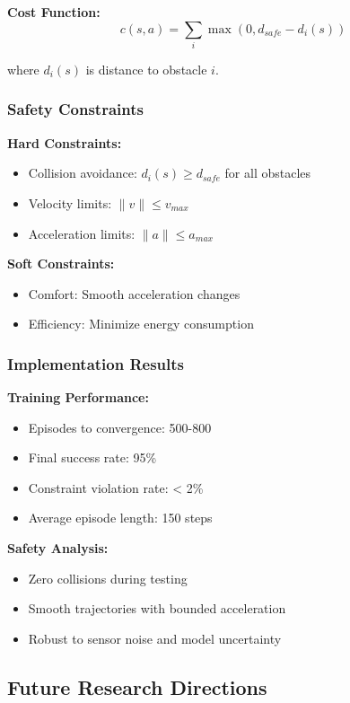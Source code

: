 \documentclass[12pt]{article}
\begin{document}
{{{{\textbf{Cost Function:}
\begin{equation}
c(s,a) = \sum_{i} \max(0, d_{safe} - d_i(s))
\end{equation}

where $d_i(s)$ is distance to obstacle $i$.

\subsubsection{Safety Constraints}

\textbf{Hard Constraints:}
\begin{itemize}
\item Collision avoidance: $d_i(s) \geq d_{safe}$ for all obstacles
\item Velocity limits: $\|v\| \leq v_{max}$
\item Acceleration limits: $\|a\| \leq a_{max}$
\end{itemize}

\textbf{Soft Constraints:}
\begin{itemize}
\item Comfort: Smooth acceleration changes
\item Efficiency: Minimize energy consumption
\end{itemize}

\subsubsection{Implementation Results}

\textbf{Training Performance:}
\begin{itemize}
\item Episodes to convergence: 500-800
\item Final success rate: 95\%
\item Constraint violation rate: < 2\%
\item Average episode length: 150 steps
\end{itemize}

\textbf{Safety Analysis:}
\begin{itemize}
\item Zero collisions during testing
\item Smooth trajectories with bounded acceleration
\item Robust to sensor noise and model uncertainty
\end{itemize}

\subsection{Future Research Directions}

}}}}
\end{document}
